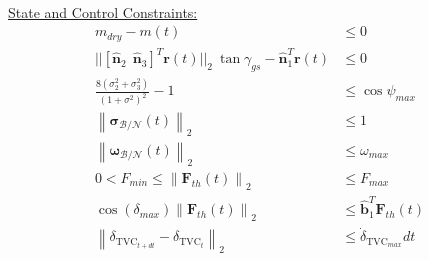 \begin{mdframed}
\begin{align*}
\end{align*}
%
\underline{State and Control Constraints:}  
\begin{align*}
m_{dry} - m(t) & \leq 0 \\
|| [\hat{\bm{n}}_2 \ \ \hat{\bm{n}}_3 ]^T \mathbf{r}(t) \lvert\lvert_2 \ \tan{\gamma_{gs}}  - \hat{\bm{n}}_1^T \mathbf{r}(t) & \leq 0 \\
%
\frac{8(\sigma_2^2 + \sigma_3^2)}{(1+\sigma^2)^2}-1 &\leq \cos{\psi_{max}}\\
%
\left \lVert \boldsymbol{\sigma}_\mathcal{B/N}(t) \right \lVert_2 & \leq 1 \\
%
\left \lVert \bm{\omega}_\mathcal{B/N}(t) \right \lVert_2 & \leq \omega_{max}\\
0 < F_{min} \leq \left \lVert \bm{F}_{th}(t) \right \lVert_2 &\leq F_{max} \\
\cos(\delta_{max}) \left \lVert \bm{F}_{th}(t) \right \lVert_2 &\leq \hat{\bm{b}}_1^T \bm{F}_{th}(t) \\
\left \lVert \delta_{\text{TVC}_{t+dt}} - \delta_{\text{TVC}_{t}} \right \lVert_2 & \leq \dot{\delta}_{\text{TVC}_{max}}dt
\end{align*}
\end{mdframed}































